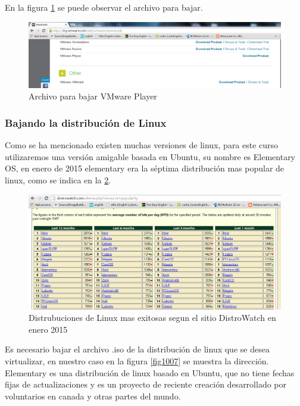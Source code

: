 \documentclass[12pt, twoside]{report}
\begin{document}
En la figura \ref{fig1005} se puede observar el archivo para bajar.

\begin{figure}
	\centering
	\includegraphics[width=1.0\linewidth]{ArchivoVMware.png}
	\caption{Archivo para bajar VMware Player}
	\label{fig1005}
\end{figure}

\subsubsection{Bajando la distribución de Linux}
Como se ha mencionado existen muchas versiones de linux, para este curso utilizaremos una versión amigable basada en Ubuntu, su nombre es Elementary OS, en enero de 2015 elementary era la séptima distribución mas popular de linux, como se indica en la \ref{fig1006}.

\begin{figure}
	\centering
	\includegraphics[width=1.0\linewidth]{DistroWatchEnero2015.png}
	\caption{Distrubuciones de Linux mas exitosas segun el sitio DistroWatch en enero 2015}
	\label{fig1006}
\end{figure}

Es necesario bajar el archivo .iso de la distribución de linux que se desea virtualizar, en nuestro caso en la figura \ref{fig1007} se muestra la dirección. Elementary es una distribución de linux basado en Ubuntu, que no tiene fechas fijas de actualizaciones y es un proyecto de reciente creación desarrollado por voluntarios en canada y otras partes del mundo.
\end{document}
